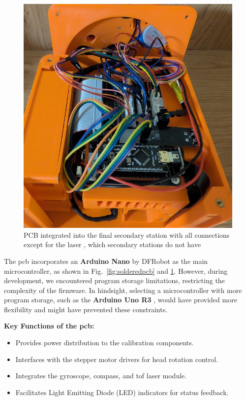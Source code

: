 \begin{figure}[H]
	\centering
	\includegraphics[width=1.0\linewidth]{figures/pcb}
	\caption{PCB integrated into the final secondary station with all connections except for the laser \cite{dfrobot_ir_sensor}, which secondary stations do not have}
	\label{fig:pcb}
\end{figure}

The \acrshort{pcb} incorporates an \textbf{Arduino Nano} by DFRobot \cite{arduino_nano_dfrobot} as the main microcontroller, as shown in Fig.~\ref{fig:solderedpcb} and \ref{fig:pcb}. However, during development, we encountered program storage limitations, restricting the complexity of the firmware. In hindsight, selecting a microcontroller with more program storage, such as the \textbf{Arduino Uno R3} \cite{arduino_uno_dfrobot}, would have provided more flexibility and might have prevented these constraints.

\textbf{Key Functions of the \acrshort{pcb}:}
\begin{itemize}
	\item Provides power distribution to the calibration components.
	\item Interfaces with the stepper motor drivers for head rotation control.
	\item Integrates the gyroscope, compass, and \acrshort{tof} laser module.
	\item Facilitates Light Emitting Diode (LED) indicators for status feedback.
\end{itemize}

